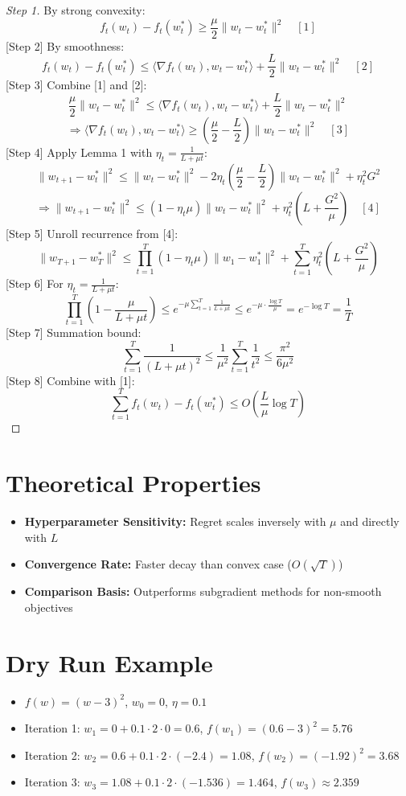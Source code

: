 \documentclass{article}
\begin{document}
\begin{proof}
[Step 1] By strong convexity:
\[
f_t(w_t) - f_t(w_t^*) \geq \frac{\mu}{2}\|w_t - w_t^*\|^2 \quad [1]
\]
[Step 2] By smoothness:
\[
f_t(w_t) - f_t(w_t^*) \leq \langle \nabla f_t(w_t), w_t - w_t^* \rangle + \frac{L}{2}\|w_t - w_t^*\|^2 \quad [2]
\]
[Step 3] Combine [1] and [2]:
\[
\frac{\mu}{2}\|w_t - w_t^*\|^2 \leq \langle \nabla f_t(w_t), w_t - w_t^* \rangle + \frac{L}{2}\|w_t - w_t^*\|^2
\]
\[
\Rightarrow \langle \nabla f_t(w_t), w_t - w_t^* \rangle \geq \left( \frac{\mu}{2} - \frac{L}{2} \right) \|w_t - w_t^*\|^2 \quad [3]
\]
[Step 4] Apply Lemma 1 with \( \eta_t = \frac{1}{L + \mu t} \):
\[
\|w_{t+1} - w_t^*\|^2 \leq \|w_t - w_t^*\|^2 - 2\eta_t \left( \frac{\mu}{2} - \frac{L}{2} \right) \|w_t - w_t^*\|^2 + \eta_t^2 G^2
\]
\[
\Rightarrow \|w_{t+1} - w_t^*\|^2 \leq (1 - \eta_t \mu) \|w_t - w_t^*\|^2 + \eta_t^2 \left( L + \frac{G^2}{\mu} \right) \quad [4]
\]
[Step 5] Unroll recurrence from [4]:
\[
\|w_{T+1} - w_T^*\|^2 \leq \prod_{t=1}^T \left( 1 - \eta_t \mu \right) \|w_1 - w_1^*\|^2 + \sum_{t=1}^T \eta_t^2 \left( L + \frac{G^2}{\mu} \right)
\]
[Step 6] For \( \eta_t = \frac{1}{L + \mu t} \):
\[
\prod_{t=1}^T \left( 1 - \frac{\mu}{L + \mu t} \right) \leq e^{-\mu \sum_{t=1}^T \frac{1}{L + \mu t}} \leq e^{-\mu \cdot \frac{\log T}{\mu}} = e^{-\log T} = \frac{1}{T}
\]
[Step 7] Summation bound:
\[
\sum_{t=1}^T \frac{1}{(L + \mu t)^2} \leq \frac{1}{\mu^2} \sum_{t=1}^T \frac{1}{t^2} \leq \frac{\pi^2}{6\mu^2}
\]
[Step 8] Combine with [1]:
\[
\sum_{t=1}^T f_t(w_t) - f_t(w_t^*) \leq O\left( \frac{L}{\mu} \log T \right)
\]
\end{proof}

\section*{Theoretical Properties}
\begin{itemize}
    \item \textbf{Hyperparameter Sensitivity:} Regret scales inversely with \( \mu \) and directly with \( L \)
    \item \textbf{Convergence Rate:} Faster decay than convex case (\( O(\sqrt{T}) \))
    \item \textbf{Comparison Basis:} Outperforms subgradient methods for non-smooth objectives
\end{itemize}

\section*{Dry Run Example}
\begin{itemize}
    \item \( f(w) = (w-3)^2 \), \( w_0 = 0 \), \( \eta = 0.1 \)
    \item Iteration 1: \( w_1 = 0 + 0.1 \cdot 2 \cdot 0 = 0.6 \), \( f(w_1) = (0.6-3)^2 = 5.76 \)
    \item Iteration 2: \( w_2 = 0.6 + 0.1 \cdot 2 \cdot (-2.4) = 1.08 \), \( f(w_2) = (-1.92)^2 = 3.68 \)
    \item Iteration 3: \( w_3 = 1.08 + 0.1 \cdot 2 \cdot (-1.536) = 1.464 \), \( f(w_3) \approx 2.359 \)
\end{itemize}
\end{document}
